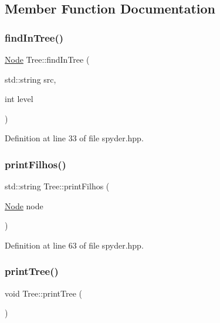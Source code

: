 \subsection{Member Function Documentation}
\mbox{\label{class_tree_ad882c6f8facefed5874a603852cd3241}} 
\subsubsection{\texorpdfstring{find\+In\+Tree()}{findInTree()}}
{\footnotesize\ttfamily \hyperlink{class_node}{Node} Tree\+::find\+In\+Tree (\begin{DoxyParamCaption}\item[{std\+::string}]{src,  }\item[{int}]{level }\end{DoxyParamCaption})\hspace{0.3cm}{\ttfamily [inline]}}



Definition at line 33 of file spyder.\+hpp.

\mbox{\label{class_tree_a8345fdedbeae0557714f1f018f7d6001}} 
\subsubsection{\texorpdfstring{print\+Filhos()}{printFilhos()}}
{\footnotesize\ttfamily std\+::string Tree\+::print\+Filhos (\begin{DoxyParamCaption}\item[{\hyperlink{class_node}{Node}}]{node }\end{DoxyParamCaption})\hspace{0.3cm}{\ttfamily [inline]}}



Definition at line 63 of file spyder.\+hpp.

\mbox{\label{class_tree_adf924fbe92e157bf8fcbc4ac6ea68aac}} 
\subsubsection{\texorpdfstring{print\+Tree()}{printTree()}}
{\footnotesize\ttfamily void Tree\+::print\+Tree (\begin{DoxyParamCaption}{ }\end{DoxyParamCaption})\hspace{0.3cm}{\ttfamily [inline]}}



